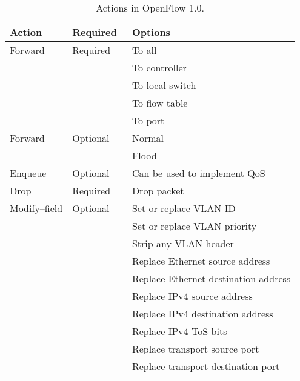 \begin{table}
  \centering
  \begin{tabular}{|l|l|l|}
    \hline
      \textbf{Action} &
      \textbf{Required} &
      \textbf{Options} \\

    \hline
      Forward &
      Required &
               To all \\
    \hline & & To controller \\
    \hline & & To local switch \\
    \hline & & To flow table \\
    \hline & & To port \\

    \hline
      Forward &
      Optional &
               Normal \\
    \hline & & Flood \\

    \hline
      Enqueue &
      Optional &
      Can be used to implement \acs{QoS} \\

    \hline
      Drop &
      Required &
      Drop packet \\

    \hline
      Modify--field &
      Optional &
               Set or replace VLAN ID \\
    \hline & & Set or replace VLAN priority \\
    \hline & & Strip any VLAN header \\
    \hline & & Replace Ethernet source address \\
    \hline & & Replace Ethernet destination address \\
    \hline & & Replace IPv4 source address \\
    \hline & & Replace IPv4 destination address \\
    \hline & & Replace IPv4 \acs{ToS} bits \\
    \hline & & Replace transport source port \\
    \hline & & Replace transport destination port \\

    \hline
  \end{tabular}
  \caption{Actions in OpenFlow 1.0.}
  \label{table:openflow-1.0.all.actions}
\end{table}

